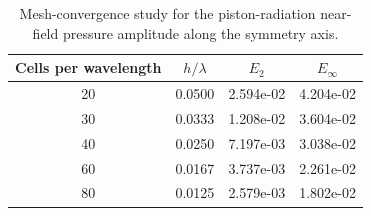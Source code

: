 \begin{table}[htbp]
\centering
\begin{tabular}{cccc}
\hline
Cells per wavelength & $h/\lambda$ & $E_2$ & $E_\infty$ \\
\hline
20 & 0.0500 & 2.594e-02 & 4.204e-02 \\
30 & 0.0333 & 1.208e-02 & 3.604e-02 \\
40 & 0.0250 & 7.197e-03 & 3.038e-02 \\
60 & 0.0167 & 3.737e-03 & 2.261e-02 \\
80 & 0.0125 & 2.579e-03 & 1.802e-02 \\
\hline
\end{tabular}
\caption{Mesh-convergence study for the piston-radiation near-field pressure amplitude along the symmetry axis.}
\label{tab:pistonConvergence}
\end{table}
